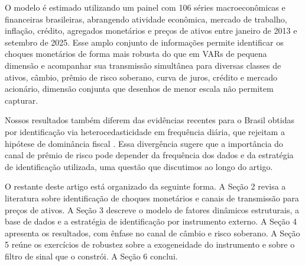 \documentclass[preprint,authoryear,review,12pt]{elsarticle}
\begin{document}
O modelo é estimado utilizando um painel com 106 séries macroeconômicas e financeiras brasileiras, abrangendo atividade econômica, mercado de trabalho, inflação, crédito, agregados monetários e preços de ativos entre janeiro de 2013 e setembro de 2025. Esse amplo conjunto de informações permite identificar os choques monetários de forma mais robusta do que em VARs de pequena dimensão e acompanhar sua transmissão simultânea para diversas classes de ativos, câmbio, prêmio de risco soberano, curva de juros, crédito e mercado acionário, dimensão conjunta que desenhos de menor escala não permitem capturar.

Nossos resultados também diferem das evidências recentes para o Brasil obtidas por identificação via heterocedasticidade em frequência diária, que rejeitam a hipótese de dominância fiscal \cite{goncalves2025}. Essa divergência sugere que a importância do canal de prêmio de risco pode depender da frequência dos dados e da estratégia de identificação utilizada, uma questão que discutimos ao longo do artigo.

O restante deste artigo está organizado da seguinte forma. A Seção 2 revisa a literatura sobre identificação de choques monetários e canais de transmissão para preços de ativos. A Seção 3 descreve o modelo de fatores dinâmicos estruturais, a base de dados e a estratégia de identificação por instrumento externo. A Seção 4 apresenta os resultados, com ênfase no canal de câmbio e risco soberano. A Seção 5 reúne os exercícios de robustez sobre a exogeneidade do instrumento e sobre o filtro de sinal que o constrói. A Seção 6 conclui.

\end{document}
